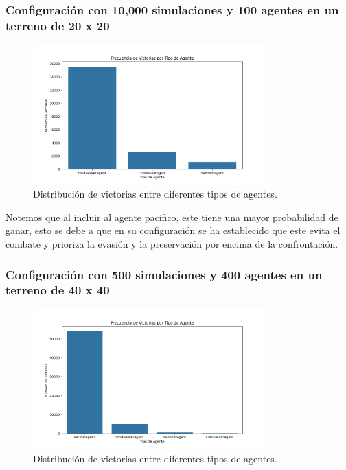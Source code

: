 \documentclass[11pt]{article}
\begin{document}
\subsubsection{Configuración con 10,000 simulaciones y 100 agentes en un terreno de 20 x 20}
\begin{figure}[H]
    \centering
    \includegraphics[width=0.8\textwidth]{images/agent_wins_num_simulations10000_size(20x20)_agents_count100.png}
    \caption{Distribución de victorias entre diferentes tipos de agentes.}
\end{figure}

Notemos que al incluir al agente pacifico, este tiene una mayor probabilidad de ganar, esto se debe a que en su configuración se ha establecido que este evita el combate y prioriza la evasión y la preservación por encima de la confrontación.

\subsubsection{Configuración con 500 simulaciones y 400 agentes en un terreno de 40 x 40}
\begin{figure}[H]
    \centering
    \includegraphics[width=0.8\textwidth]{images/agent_wins_num_simulations500_size(40x40)_agents_count500.png}
    \caption{Distribución de victorias entre diferentes tipos de agentes.}
\end{figure}
\end{document}
